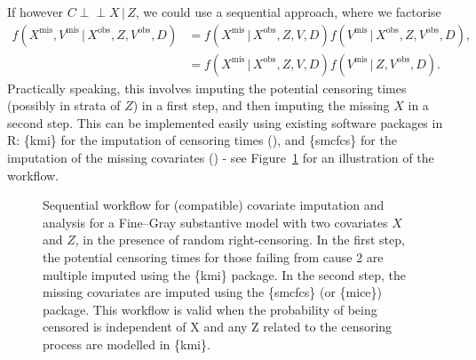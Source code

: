 \documentclass[
  letterpaper,
  paper=240mm:170mm,
  twoside=true,
  open=right,
  fontsize=10pt,
  pagesize=false,
  BCOR=15mm,
  DIV=14,
  headinclude=true,
  footinclude=false,
  headsepline=on]{scrbook}
\newcommand{\given}{\,|\,}
\newcommand{\indep}{\perp\!\!\!\!\perp}
\begin{document}
If however \(C \indep X \given Z\), we could use a sequential approach,
where we factorise \begin{align*}
    f(X^{\text{mis}}, V^{\text{mis}} \given X^{\text{obs}},Z,V^{\text{obs}},D) &= f(X^{\text{mis}} \given X^{\text{obs}},Z,V,D)f(V^{\text{mis}} \given X^{\text{obs}},Z,V^{\text{obs}},D), \\
    &= f(X^{\text{mis}} \given X^{\text{obs}},Z,V,D)f(V^{\text{mis}} \given Z,V^{\text{obs}},D).
\end{align*} Practically speaking, this involves imputing the potential
censoring times (possibly in strata of \(Z\)) in a first step, and then
imputing the missing \(X\) in a second step. This can be implemented
easily using existing software packages in R: \{kmi\} for the imputation
of censoring times
(), and \{smcfcs\} for the imputation of the missing
covariates () - see Figure~\ref{fig-workflow} for an
illustration of the workflow.

\begin{figure}


\caption{\label{fig-workflow}Sequential workflow for (compatible)
covariate imputation and analysis for a Fine--Gray substantive model
with two covariates \(X\) and \(Z\), in the presence of random
right-censoring. In the first step, the potential censoring times for
those failing from cause 2 are multiple imputed using the \{kmi\}
package. In the second step, the missing covariates are imputed using
the \{smcfcs\} (or \{mice\}) package. This workflow is valid when the
probability of being censored is independent of X and any Z related to
the censoring process are modelled in \{kmi\}.}

\end{figure}%
\end{document}
